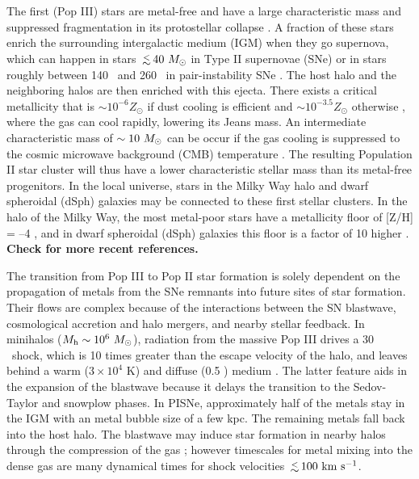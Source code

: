 \documentclass[apjl]{emulateapj}
\begin{document}
The first (Pop III) stars are metal-free and have a large
characteristic mass and suppressed fragmentation in its protostellar
collapse \citep{Abel00, ABN02, Bromm02_P3, Yoshida03, OShea07a}.  A
fraction of these stars enrich the surrounding intergalactic medium
(IGM) when they go supernova, which can happen in stars $\lsim40~\Ms$
in Type II supernovae (SNe) or in stars roughly between 140 \Ms~and
260 \Ms~in pair-instability SNe \citep[PISNe;][]{2002ApJ...567..532H}.
The host halo and the neighboring halos are then enriched with this
ejecta.  There exists a critical metallicity that is $\sim 10^{-6}
Z_\odot$ if dust cooling is efficient \citep{Omukai05,
  Schneider06_Frag, clark08} and $\sim 10^{-3.5} Z_\odot$ otherwise
\citep{Bromm01, 2009ApJ...691..441S}, where the gas can cool rapidly,
lowering its Jeans mass.  An intermediate characteristic mass of
$\sim10~\Ms$ can be occur if the gas cooling is suppressed to the
cosmic microwave background (CMB) temperature \citep{Larson98,
  Tumlinson07_IMF, 2009ApJ...691..441S}.  The resulting Population II
star cluster will thus have a lower characteristic stellar mass than
its metal-free progenitors.  In the local universe, stars in the Milky
Way halo and dwarf spheroidal (dSph) galaxies may be connected to
these first stellar clusters.  In the halo of the Milky Way, the most
metal-poor stars have a metallicity floor of [Z/H] = --4
\citep{Beers05}, and in dwarf spheroidal (dSph) galaxies this floor is
a factor of 10 higher \citep{Tolstoy04, Helmi06}.  \textbf{Check for
  more recent references.}

The transition from Pop III to Pop II star formation is solely
dependent on the propagation of metals from the SNe remnants into
future sites of star formation.  Their flows are complex because of
the interactions between the SN blastwave, cosmological accretion and
halo mergers, and nearby stellar feedback.  In minihalos ($M_{\rm h}
\sim 10^6~\Ms$), radiation from the massive Pop III drives a 30
\kms~shock, which is 10 times greater than the escape velocity of the
halo, and leaves behind a warm ($3 \times 10^4$ K) and diffuse (0.5
\cubecm) medium \citep{Kitayama04, Whalen04, Abel07}.  The latter
feature aids in the expansion of the blastwave because it delays the
transition to the Sedov-Taylor and snowplow phases.  In PISNe,
approximately half of the metals stay in the IGM with an metal bubble
size of a few kpc.  The remaining metals fall back into the host halo.
The blastwave may induce star formation in nearby halos through the
compression of the gas \citep{Ferrara98}; however timescales for metal
mixing into the dense gas are many dynamical times \citep{Cen08} for
shock velocities $\lsim 100~\kms$.
\end{document}
